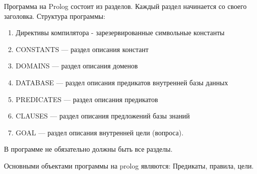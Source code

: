 \documentclass[../main.tex]{subfile}
\begin{document}
	Программа на Prolog состоит из разделов. Каждый раздел начинается со своего заголовка.
	Структура программы: 
	\begin{enumerate}
		\item Директивы компилятора - зарезервированные символьные константы
		\item CONSTANTS — раздел описания констант
		\item DOMAINS — раздел описания доменов
		\item DATABASE — раздел описания предикатов внутренней базы данных
		\item PREDICATES — раздел описания предикатов
		\item CLAUSES — раздел описания предложений базы знаний
		\item GOAL — раздел описания внутренней цели (вопроса).
	\end{enumerate}
	В программе не обязательно должны быть все разделы.
	
	Основными объектами программы на prolog являются: Предикаты, правила, цели.
\end{document}
